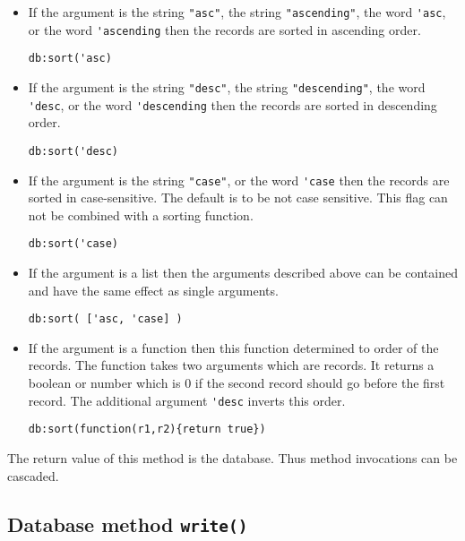 \documentclass[11pt,a4paper]{scrbook}
\begin{document}
\begin{itemize}
\item If the argument is the string \verb|"asc"|, the string
  \verb|"ascending"|, the word \verb|'asc|, or the word \verb|'ascending| then
  the records are sorted in ascending order.
\begin{lstlisting}[language=BibTool,mathescape=true]
db:sort('asc)
\end{lstlisting}

\item If the argument is the string \verb|"desc"|, the string
  \verb|"descending"|, the word \verb|'desc|, or the word \verb|'descending|
  then the records are sorted in descending order.
\begin{lstlisting}[language=BibTool,mathescape=true]
db:sort('desc)
\end{lstlisting}

\item If the argument is the string \verb|"case"|, or the word \verb|'case|
  then the records are sorted in case-sensitive. The default is to be not case
  sensitive. This flag can not be combined with a sorting function.
\begin{lstlisting}[language=BibTool,mathescape=true]
db:sort('case)
\end{lstlisting}

\item If the argument is a list then the arguments described above can be
  contained and have the same effect as single arguments.
\begin{lstlisting}[language=BibTool,mathescape=true]
db:sort( ['asc, 'case] )
\end{lstlisting}

\item If the argument is a function then this function determined to order of
  the records. The function takes two arguments which are records. It returns
  a boolean or number which is 0 if the second record should go before the
  first record. The additional argument \verb|'desc| inverts this order. 
\begin{lstlisting}[language=BibTool,mathescape=true]
db:sort(function(r1,r2){return true})
\end{lstlisting}
\end{itemize}

The return value of this method is the database. Thus method invocations can
be cascaded.


\subsection{Database method \texttt{write()}}
\end{document}
